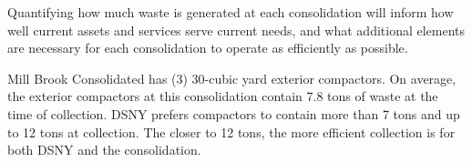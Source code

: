 
    Quantifying how much waste is generated at each consolidation will inform how well current assets and services serve current needs, and what additional elements are necessary for each consolidation to operate as efficiently as possible.
    
    Mill Brook Consolidated has (3) 30-cubic yard exterior compactors. On average, the exterior compactors at this consolidation contain 7.8 tons of waste at the time of collection. DSNY prefers compactors to contain more than 7 tons and up to 12 tons at collection. The closer to 12 tons, the more efficient collection is for both DSNY and the consolidation.